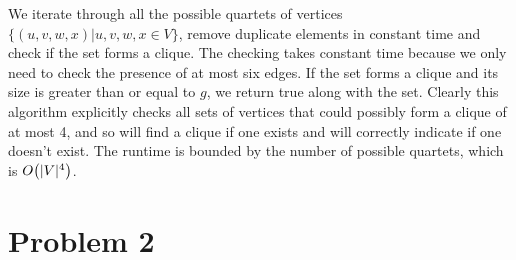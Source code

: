 \documentclass[11pt]{article}
\let\origleft\left
\let\origright\right
\renewcommand{\left}{\mathopen{}\mathclose\bgroup\origleft}
\renewcommand{\right}{\aftergroup\egroup\origright}
\newcommand{\p}[1]{\left(#1\right)}
\newcommand{\BigOh}[1]{O\p{#1}}
\begin{document}
\begin{enumerate}[(a)]
We iterate through all the possible quartets of vertices $\{(u,v,w,x) | u,v,w,x \in V\}$, remove duplicate elements in constant time and check if the set forms a clique. The checking takes constant time because we only need to check the presence of at most six edges. If the set forms a clique and its size is greater than or equal to $g$, we return true along with the set. Clearly this algorithm explicitly checks all sets of vertices that could possibly form a clique of at most 4, and so will find a clique if one exists and will correctly indicate if one doesn't exist. The runtime is bounded by the number of possible quartets, which is $\BigOh{|V|^4}$.
\end{enumerate}


\newpage
\section*{Problem 2}
\end{document}
